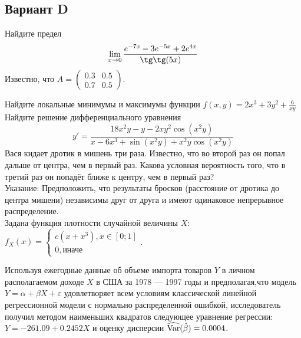 \documentclass[addpoints, answers]{exam} %
\begin{document}
\subsection{Вариант D}
\begin{questions}
\question Найдите предел 
\[
\lim_{x\to 0} \frac{e^{-7x}-3e^{-5x}+2e^{4x}}{\tg\tg(5x)}
\]
\question Известно, что $A=
\left(\begin{array}{cc}
0.3 & 0.5\\
0.7 & 0.5
\end{array}\right)$.
\question Найдите локальные минимумы и максимумы функции $f(x,y)=2x^3+3y^2+\frac{6}{xy}$\\
\question Найдите решение дифференциального уравнения 
\[
y'=\frac{18x^2y-y-2xy^2\cos (x^2y)}{x-6x^3+\sin(x^2y)+x^2y\cos(x^2 y)}
\]
\question Вася кидает дротик в мишень три раза. Известно, что во второй раз он попал дальше от центра, чем в первый раз. Какова условная вероятность того, что в третий раз он попадёт ближе к центру, чем в первый раз?\\
Указание: Предположить, что результаты бросков (расстояние от дротика до центра мишени) независимы друг от друга и имеют одинаковое непрерывное распределение.\\
\question Задана функция плотности случайной величины $X$:\\
$f_X(x)=\begin{cases}
c(x+x^3), x \in [0;1] \\
0, \text{иначе}
\end{cases}$.
\question Используя ежегодные данные об объеме импорта товаров $Y$ в личном располагаемом доходе $X$ в США за 1978 --- 1997 годы и предполагая,что модель $Y=\alpha+\beta X+\varepsilon$ удовлетворяет всем условиям классической линейной регрессионной модели с нормально распределенной ошибкой, исследователь получил методом наименьших квадратов следующее уравнение регрессии: $Y=-261.09+0.2452X$ и оценку дисперсии $\widehat{\operatorname{Var}}(\hat{\beta})=0.0004$. 
\begin{parts}

\end{parts}
\end{questions}
\end{document}
